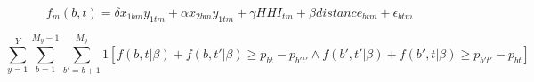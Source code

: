 \documentclass{article}[12pt]
\begin{document}
\begin{equation}
    \label{eq:payoff2}
    f_m(b,t) = \delta x_{1bm} y_{1tm} + \alpha x_{2bm} y_{1tm} + \gamma HHI_{tm} + \beta distance_{btm} + \epsilon_{btm}
\end{equation}

\begin{equation}
    \label{eq:objective2}
    \sum_{y=1}^{Y} \sum_{b=1}^{M_y - 1} \sum_{b'=b+1}^{M_y} 1[f(b,t|\beta) + f(b,t'|\beta) \geq p_{bt} - p_{b't'} \land f(b',t'|\beta) + f(b',t|\beta) \geq p_{b't'} - p_{bt}]
\end{equation}
\end{document}
